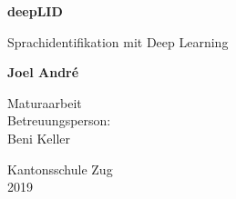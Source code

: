\begin{titlepage}
    \begin{center}
        \vspace*{1cm}
        
        \Huge
        \textbf{deepLID}
        
        \vspace{0.5cm}
        \LARGE
        Sprachidentifikation mit Deep Learning
        
        \vspace{1.5cm}
        
        \textbf{Joel André}
        
        \vfill
        
        \Large
        Maturaarbeit\\
        Betreuungsperson:\\ 
        Beni Keller
        
        \vspace{0.8cm}
        
        
        Kantonsschule Zug\\
        2019
        
    \end{center}
\end{titlepage}